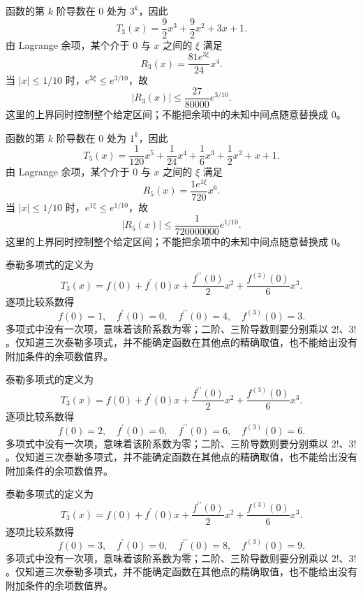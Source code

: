 \documentclass[UTF8,12pt,a4paper,fontset=fandol]{ctexart}
\begin{document}
\begin{solve}\label{ans:c10q18}
函数的第 $k$ 阶导数在 $0$ 处为 $3^k$，因此
\[
T_{3}(x)=\frac{9}{2}x^{3}+\frac{9}{2}x^{2}+3x+1.
\]
由 Lagrange 余项，某个介于 $0$ 与 $x$ 之间的 $\xi$ 满足
\[
R_{3}(x)=\frac{81e^{3\xi}}{24}x^{4}.
\]
当 $|x|\le1/10$ 时，$e^{3\xi}\le e^{3/10}$，故
\[
|R_{3}(x)|\le \frac{27}{80000}e^{3/10}.
\]
这里的上界同时控制整个给定区间；不能把余项中的未知中间点随意替换成 $0$。
\end{solve}

\begin{solve}\label{ans:c10q19}
函数的第 $k$ 阶导数在 $0$ 处为 $1^k$，因此
\[
T_{5}(x)=\frac{1}{120}x^{5}+\frac{1}{24}x^{4}+\frac{1}{6}x^{3}+\frac{1}{2}x^{2}+x+1.
\]
由 Lagrange 余项，某个介于 $0$ 与 $x$ 之间的 $\xi$ 满足
\[
R_{5}(x)=\frac{1e^{1\xi}}{720}x^{6}.
\]
当 $|x|\le1/10$ 时，$e^{1\xi}\le e^{1/10}$，故
\[
|R_{5}(x)|\le \frac{1}{720000000}e^{1/10}.
\]
这里的上界同时控制整个给定区间；不能把余项中的未知中间点随意替换成 $0$。
\end{solve}

\begin{solve}\label{ans:c10q20}
泰勒多项式的定义为
\[
T_3(x)=f(0)+f^{\prime}(0)x+\frac{f^{\prime\prime}(0)}2x^2+\frac{f^{(3)}(0)}6x^3.
\]
逐项比较系数得
\[
f(0)=1,\quad f^{\prime}(0)=0,\quad f^{\prime\prime}(0)=4,\quad f^{(3)}(0)=3.
\]
多项式中没有一次项，意味着该阶系数为零；二阶、三阶导数则要分别乘以 $2!$、$3!$。仅知道三次泰勒多项式，并不能确定函数在其他点的精确取值，也不能给出没有附加条件的余项数值界。
\end{solve}

\begin{solve}\label{ans:c10q21}
泰勒多项式的定义为
\[
T_3(x)=f(0)+f^{\prime}(0)x+\frac{f^{\prime\prime}(0)}2x^2+\frac{f^{(3)}(0)}6x^3.
\]
逐项比较系数得
\[
f(0)=2,\quad f^{\prime}(0)=0,\quad f^{\prime\prime}(0)=6,\quad f^{(3)}(0)=6.
\]
多项式中没有一次项，意味着该阶系数为零；二阶、三阶导数则要分别乘以 $2!$、$3!$。仅知道三次泰勒多项式，并不能确定函数在其他点的精确取值，也不能给出没有附加条件的余项数值界。
\end{solve}

\begin{solve}\label{ans:c10q22}
泰勒多项式的定义为
\[
T_3(x)=f(0)+f^{\prime}(0)x+\frac{f^{\prime\prime}(0)}2x^2+\frac{f^{(3)}(0)}6x^3.
\]
逐项比较系数得
\[
f(0)=3,\quad f^{\prime}(0)=0,\quad f^{\prime\prime}(0)=8,\quad f^{(3)}(0)=9.
\]
多项式中没有一次项，意味着该阶系数为零；二阶、三阶导数则要分别乘以 $2!$、$3!$。仅知道三次泰勒多项式，并不能确定函数在其他点的精确取值，也不能给出没有附加条件的余项数值界。
\end{solve}
\end{document}
